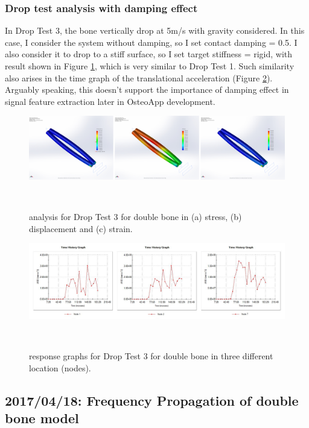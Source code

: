 \documentclass{sigchi}
\begin{document}
\subsubsection{Drop test analysis with damping effect}

In Drop Test 3, the bone vertically drop at 5m/s with gravity considered. In this case, I consider the system without damping, so I set contact damping = 0.5. I also consider it to drop to a stiff surface, so I set target stiffness = rigid, with result shown in Figure \ref{fig:db_dt3_ana}, which is very similar to Drop Test 1. Such similarity also arises in the time graph of the translational acceleration (Figure \ref{fig:db_dt3_res}). Arguably speaking, this doesn't support the importance of damping effect in signal feature extraction later in OsteoApp development. 

\begin{figure}
  \centering
  \includegraphics[width=1.95\columnwidth]{figures/db_dt3_ana}
  \caption{analysis for Drop Test 3 for double bone in (a) stress, (b) displacement and (c) strain.}
    ~\label{fig:db_dt3_ana}
\end{figure}

\begin{figure}
  \centering
  \includegraphics[width=1.95\columnwidth]{figures/db_dt3_res}
  \caption{response graphs for Drop Test 3 for double bone in three different location (nodes).}
    ~\label{fig:db_dt3_res}
\end{figure}

\subsection{2017/04/18: Frequency Propagation of double bone model}
\end{document}
